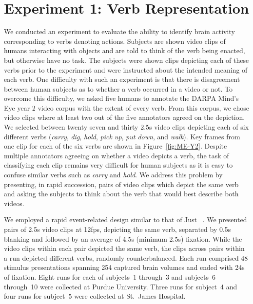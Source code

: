 \section{Experiment 1: Verb Representation}
\label{sec:experiment1}

We conducted an experiment to evaluate the ability to identify brain activity
corresponding to verbs denoting actions.
%
Subjects are shown video clips of humans interacting with objects and are told
to think of the verb being enacted, but otherwise have no task.
%
The subjects were shown clips depicting each of these verbs prior to the
experiment and were instructed about the intended meaning of each verb.
%
One difficulty with such an experiment is that there is disagreement between
human subjects as to whether a verb occurred in a video or not.
%
To overcome this difficulty, we asked five humans to annotate the
DARPA Mind's Eye year 2 video corpus with the extent of every verb.
%
From this corpus, we chose video clips where at least two out of the five
annotators agreed on the depiction.
%
We selected between twenty seven and thirty 2.5s video clips depicting each of
six different verbs (\emph{carry}, \emph{dig}, \emph{hold}, \emph{pick up},
\emph{put down}, and \emph{walk}).
%
Key frames from one clip for each of the six verbs are shown in
Figure~\ref{fig:ME-Y2}.
%
Despite multiple annotators agreeing on whether a video depicts a verb,
the task of classifying each clip remains very difficult for human subjects
as it is easy to confuse similar verbs such as \emph{carry} and \emph{hold}.
%
We address this problem by presenting, in rapid succession, pairs of video
clips which depict the same verb and asking the subjects to think about the
verb that would best describe both videos.

We employed a rapid event-related design similar to that of Just
\etal\ \cite{just2010}.
%
We presented pairs of 2.5s video clips at 12fps, depicting the same
verb, separated by 0.5s blanking and followed by an average of 4.5s (minimum
2.5s) fixation.
%
While the video clips within each pair depicted the same verb, the clips across
pairs within a run depicted different verbs, randomly counterbalanced.
%
Each run comprised 48 stimulus presentations spanning 254 captured brain volumes
and ended with 24s of fixation.
%
Eight runs for each of subjects~1 through~3 and subjects~6 through~10
were collected at Purdue University.
%
Three runs for subject~4 and four runs for subject~5 were collected at
St.~James Hospital.


